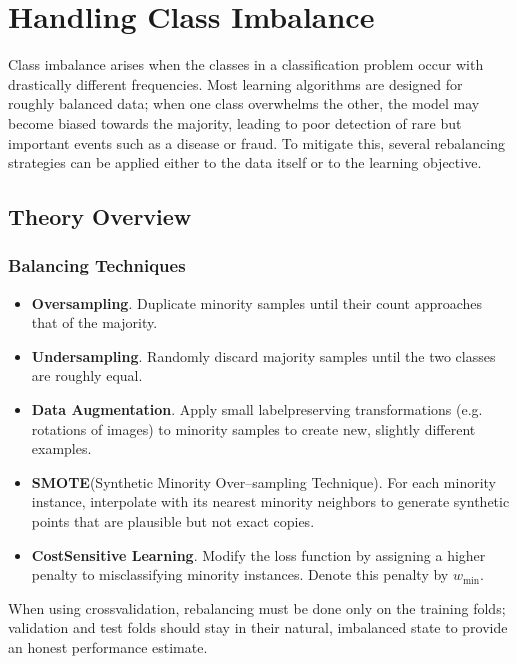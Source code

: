 \documentclass[12pt, a4paper]{article}
\begin{document}
\section{Handling Class Imbalance}

Class imbalance arises when the classes in a classification problem occur with drastically different frequencies.  
Most learning algorithms are designed for roughly balanced data; when one class overwhelms the other, the model may become biased towards the majority, leading to poor detection of rare but important events such as a disease or fraud.  
To mitigate this, several rebalancing strategies can be applied either to the data itself or to the learning objective.

\subsection{Theory Overview}

\subsubsection{Balancing Techniques}
\begin{itemize}
    \item \textbf{Oversampling}.  Duplicate minority samples until their count approaches that of the majority.  
    \item \textbf{Undersampling}.  Randomly discard majority samples until the two classes are roughly equal.  
    \item \textbf{Data Augmentation}.  Apply small labelpreserving transformations (e.g. rotations of images) to minority samples to create new, slightly different examples.  
    \item \textbf{SMOTE}\;(Synthetic Minority Over--sampling Technique).  For each minority instance, interpolate with its nearest minority neighbors to generate synthetic points that are plausible but not exact copies.  
    \item \textbf{CostSensitive Learning}.  Modify the loss function by assigning a higher penalty to misclassifying minority instances. Denote this penalty by \(w_{\text{min}}\).  
\end{itemize}

When using crossvalidation, rebalancing must be done only on the training folds; validation and test folds should stay in their natural, imbalanced state to provide an honest performance estimate.
\end{document}
